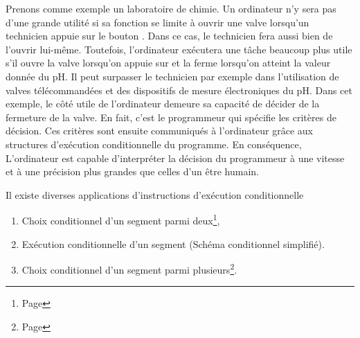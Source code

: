 Prenons comme exemple un laboratoire de chimie. Un ordinateur n'y sera
pas d'une grande utilit\'e si sa fonction se limite \`a ouvrir une valve
lorsqu'un technicien appuie sur le bouton  . Dans ce cas, le
technicien fera aussi bien de l'ouvrir lui-m\^eme. Toutefois, l'ordinateur
ex\'ecutera une t\^ache beaucoup plus utile s'il ouvre la valve lorsqu'on
appuie sur  et la ferme lorsqu'on atteint la valeur donn\'ee du
pH. Il peut surpasser le technicien par exemple dans l'utilisation de
valves t\'el\'ecommand\'ees et des dispositifs de mesure \'electroniques du pH.
Dans cet exemple, le c\^ot\'e utile de l'ordinateur demeure sa capacit\'e de
d\'ecider de la fermeture de la valve. En fait, c'est le programmeur qui
sp\'ecifie les crit\`eres de d\'ecision. Ces crit\`eres sont ensuite communiqu\'es
\`a l'ordinateur gr\^ace aux structures d'ex\'ecution conditionnelle du
programme. En cons\'equence, L'ordinateur est capable d'interpr\'eter la
d\'ecision du programmeur \`a une vitesse et \`a une pr\'ecision plus grandes
que celles d'un \^etre humain.


Il existe diverses applications d'instructions d'ex\'ecution conditionnelle 
\begin{enumerate}
 \item Choix conditionnel d'un segment parmi deux\footnote{Page \pageref{If}},
 \item Ex\'ecution conditionnelle d'un segment (Sch\'ema conditionnel simplifi\'e).
 \item Choix conditionnel d'un segment parmi plusieurs\footnote{Page
 \pageref{Ventilation}}.
\end{enumerate}
